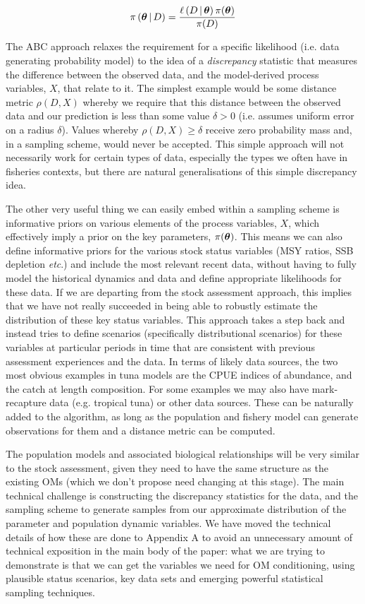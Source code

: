 \documentclass[11pt]{article}
\newcommand{\xtheta}{\mbox{\boldmath$\theta$}}
\begin{document}
\begin{equation*}
  \pi\left(\xtheta\,|\,D\right) = \frac{\ell\left(D\,|\,\xtheta\right)\pi(\xtheta)}{\pi(D)}
\end{equation*}

The ABC approach relaxes the requirement for a specific likelihood (i.e. data generating probability model) to the idea of a \emph{discrepancy} statistic that measures the difference between the observed data, and the model-derived process variables, $X$, that relate to it. The simplest example would be some distance metric $\rho(D,X)$ whereby we require that this distance between the observed data and our prediction is less than some value $\delta>0$ (i.e. assumes uniform error on a radius $\delta$). Values whereby $\rho(D,X)\geq\delta$ receive zero probability mass and, in a sampling scheme, would never be accepted. This simple approach will not necessarily work for certain types of data, especially the types we often have in fisheries contexts, but there are natural generalisations of this simple discrepancy idea.

The other very useful thing we can easily embed within a sampling scheme is informative priors on various elements of the process variables, $X$, which effectively imply a prior on the key parameters, $\pi(\xtheta)$. This means we can also define informative priors for the various stock status variables (MSY ratios, SSB depletion \textit{etc}.) and include the most relevant recent data, without having to fully model the historical dynamics and data and define appropriate likelihoods for these data. If we are departing from the stock assessment approach, this implies that we have not really succeeded in being able to robustly estimate the distribution of these key status variables. This approach takes a step back and instead tries to define scenarios (specifically distributional scenarios) for these variables at particular periods in time that are consistent with previous assessment experiences and the data. In terms of likely data sources, the two most obvious examples in tuna models are the CPUE indices of abundance, and the catch at length composition. For some examples we may also have mark-recapture data (e.g. tropical tuna) or other data sources. These can be naturally added to the algorithm, as long as the population and fishery model can generate observations for them and a distance metric can be computed.

The population models and associated biological relationships will be very similar to the stock assessment, given they need to have the same structure as the existing OMs (which we don't propose need changing at this stage). The main technical challenge is constructing the discrepancy statistics for the data, and the sampling scheme to generate samples from our approximate distribution of the parameter and population dynamic variables. We have moved the technical details of how these are done to Appendix A to avoid an unnecessary amount of technical exposition in the main body of the paper: what we are trying to demonstrate is that we can get the variables we need for OM conditioning, using plausible status scenarios, key data sets and emerging powerful statistical sampling techniques.
\end{document}
